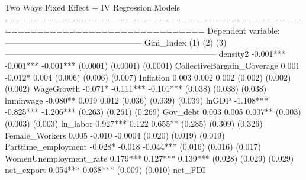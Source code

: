  Two Ways Fixed Effect + IV Regression Models =============================================================================                                           Dependent variable:                                            --------------------------------------------------                                                Gini_Index                                                      (1)              (2)              (3)        ----------------------------------------------------------------------------- density2                      -0.001***        -0.001***        -0.001***                                    (0.0001)         (0.0001)         (0.0001)                                                                                   CollectiveBargain_Coverage      0.001           -0.012*           0.004                                      (0.006)          (0.006)          (0.007)                                                                                    Inflation                       0.003            0.002            0.002                                      (0.002)          (0.002)          (0.002)                                                                                    WageGrowth                     -0.071*         -0.111***        -0.101***                                    (0.038)          (0.038)          (0.038)                                                                                    lnminwage                      -0.080**          0.019            0.012                                      (0.036)          (0.039)          (0.039)                                                                                    lnGDP                         -1.108***        -0.825***        -1.206***                                    (0.263)          (0.261)          (0.269)                                                                                    Gov_debt                        0.003            0.005           0.007**                                     (0.003)          (0.003)          (0.003)                                                                                    ln_labor                       0.927***          0.122           0.655**                                     (0.285)          (0.309)          (0.326)                                                                                    Female_Workers                  0.005            -0.010          -0.0004                                     (0.020)          (0.019)          (0.019)                                                                                    Parttime_employment            -0.028*           -0.018         -0.044***                                    (0.016)          (0.016)          (0.017)                                                                                    WomenUnemployment_rate         0.179***         0.127***         0.139***                                    (0.028)          (0.029)          (0.029)                                                                                    net_export                                      0.054***         0.038***                                                     (0.009)          (0.010)                                                                                    net_FDI       